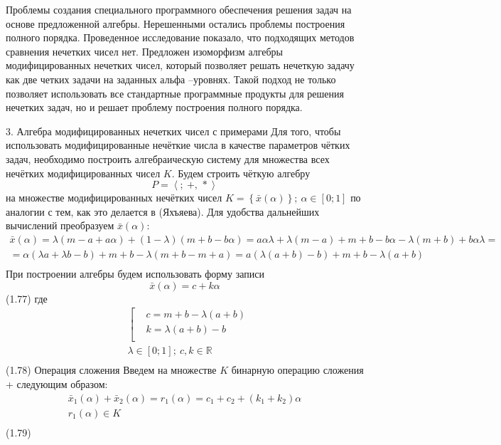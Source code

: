 Проблемы создания специального программного обеспечения решения задач на основе предложенной алгебры. Нерешенными остались проблемы построения полного порядка. Проведенное исследование показало, что подходящих методов сравнения нечетких чисел нет.
Предложен изоморфизм алгебры модифицированных нечетких чисел, который позволяет решать нечеткую задачу как две четких задачи на заданных альфа –уровнях.
Такой подход не только позволяет использовать все стандартные программные продукты для решения нечетких задач, но и решает проблему построения полного порядка.


3. Алгебра модифицированных нечетких чисел с примерами
Для того, чтобы использовать модифицированные нечёткие числа в качестве параметров чётких задач, необходимо построить алгебраическую систему для множества всех нечётких модифицированных чисел $K$. 
Будем строить чёткую алгебру \[P=\left\langle ;\ +,\,* \right\rangle \] на множестве модифицированных нечётких чисел $K=\left\{ \bar{x}\left( \alpha  \right) \right\};\ \alpha \in \left[ 0;1 \right]$ по аналогии с тем, как это делается в (Яхъяева). Для удобства дальнейших вычислений преобразуем $\bar{x}\left( \alpha  \right)$:
	\[\begin{matrix}
  \bar{x}\left( \alpha  \right)=\lambda \left( m-a+a\alpha  \right)+\left( 1-\lambda  \right)\left( m+b-b\alpha  \right)=a\alpha \lambda +\lambda \left( m-a \right)+m+b-b\alpha -\lambda \left( m+b \right)+b\alpha \lambda = \\ 
  =\alpha \left( \lambda a+\lambda b-b \right)+m+b-\lambda \left( m+b-m+a \right)=a\left( \lambda \left( a+b \right)-b \right)+m+b-\lambda \left( a+b \right) \\ 
\end{matrix}\] 
При построении алгебры будем использовать форму записи
	\[\bar{x}\left( \alpha  \right)=c+k\alpha \] 	(1.77)
где
	\[\begin{aligned}
  & \left[ \begin{aligned}
  & c=m+b-\lambda \left( a+b \right) \\ 
 & k=\lambda \left( a+b \right)-b \\ 
\end{aligned} \right. \\ 
 & \lambda \in \left[ 0;1 \right];\ c,k\in \mathbb{R} \\ 
\end{aligned}\] 	(1.78)
Операция сложения
Введем на множестве $K$ бинарную операцию сложения + следующим образом:
	\[\begin{matrix}
  {{{\bar{x}}}_{1}}(\alpha )+{{{\bar{x}}}_{2}}(\alpha )={{r}_{1}}\left( \alpha  \right)={{c}_{1}}+{{c}_{2}}+\left( {{k}_{1}}+{{k}_{2}} \right)\alpha  \\ 
  {{r}_{1}}\left( \alpha  \right)\in K \\ 
\end{matrix}\] 	(1.79)
